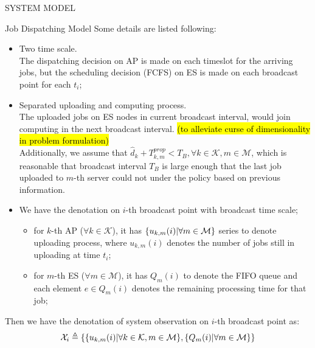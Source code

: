 \documentclass[10pt, conference, letterpaper]{IEEEtran}
\newcommand{\define}{\triangleq}
\DeclarePairedDelimiter{\set}{\{}{\}}
\newcommand{\apSet}{\mathcal{K}}
\newcommand{\esSet}{\mathcal{M}}
\newcommand{\Obsv}{\mathcal{X}}
\begin{document}
\begin{section}{SYSTEM MODEL}
\begin{subsection}{Job Dispatching Model}
            Some details are listed following:
            \begin{itemize}
                \item Two time scale.\\
                The dispatching decision on AP is made on each timeslot for the arriving jobs, but the scheduling decision (FCFS) on ES is made on each broadcast point for each $t_i$;
                \item Separated uploading and computing process. \\
                The uploaded jobs on ES nodes in current broadcast interval, would join computing in the next broadcast interval. \hl{(to alleviate curse of dimensionality in problem formulation)} \\
                Additionally, we assume that $\hat{d}_k + T^{prop}_{k,m} < T_B, \forall k\in\apSet,m\in\esSet$, which is reasonable that broadcast interval $T_B$ is large enough that the last job uploaded to $m$-th server could not under the policy based on previous information.
                \item We have the denotation on $i$-th broadcast point with broadcast time scale;
                    \begin{itemize}
                        \item for $k$-th AP ($\forall k\in\apSet$), it has $\set{u_{k,m}(i)|\forall m\in\esSet}$ series to denote uploading process, where $u_{k,m}(i)$ denotes the number of jobs still in uploading at time $t_i$;
                        \item for $m$-th ES ($\forall m\in\esSet$), it has $Q_m(i)$ to denote the FIFO queue and each element $e \in Q_m(i)$ denotes the remaining processing time for that job;
                    \end{itemize}
            \end{itemize}

            Then we have the denotation of system observation on $i$-th broadcast point as:
            \begin{align}
                \Obsv_i \define \{ \set{u_{k,m}(i)|\forall k\in\apSet,m\in\esSet}, \set{Q_m(i)|\forall m\in\esSet} \}
            \end{align}
        \end{subsection}
    \end{section}
\end{document}
